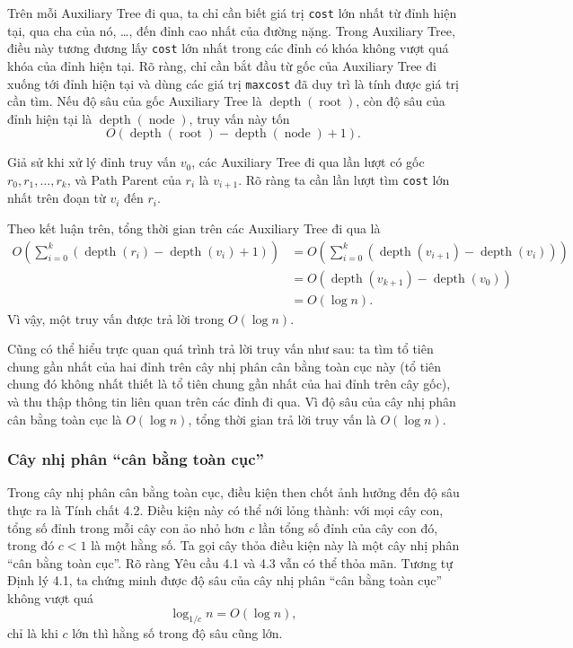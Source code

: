 \documentclass[11pt]{article}
\begin{document}
Trên mỗi Auxiliary Tree đi qua, ta chỉ cần biết giá trị \texttt{cost} lớn nhất
từ đỉnh hiện tại, qua cha của nó, \ldots, đến đỉnh cao nhất của đường nặng.
Trong Auxiliary Tree, điều này tương đương lấy \texttt{cost} lớn nhất trong
các đỉnh có khóa không vượt quá khóa của đỉnh hiện tại. Rõ ràng, chỉ cần bắt
đầu từ gốc của Auxiliary Tree đi xuống tới đỉnh hiện tại và dùng các giá trị
\texttt{maxcost} đã duy trì là tính được giá trị cần tìm. Nếu độ sâu của gốc
Auxiliary Tree là $\operatorname{depth}(\operatorname{root})$, còn độ sâu của
đỉnh hiện tại là $\operatorname{depth}(\operatorname{node})$, truy vấn này tốn
\[
  O(\operatorname{depth}(\operatorname{root})
    -\operatorname{depth}(\operatorname{node})+1).
\]

Giả sử khi xử lý đỉnh truy vấn $v_0$, các Auxiliary Tree đi qua lần lượt có
gốc $r_0,r_1,\ldots,r_k$, và Path Parent của $r_i$ là $v_{i+1}$. Rõ ràng ta
cần lần lượt tìm \texttt{cost} lớn nhất trên đoạn từ $v_i$ đến $r_i$.

Theo kết luận trên, tổng thời gian trên các Auxiliary Tree đi qua là
\[
\begin{aligned}
O\left(\sum_{i=0}^{k}
(\operatorname{depth}(r_i)-\operatorname{depth}(v_i)+1)\right)
&=
O\left(\sum_{i=0}^{k}
(\operatorname{depth}(v_{i+1})-\operatorname{depth}(v_i))\right) \\
&= O(\operatorname{depth}(v_{k+1})-\operatorname{depth}(v_0)) \\
&= O(\log n).
\end{aligned}
\]
Vì vậy, một truy vấn được trả lời trong $O(\log n)$.

Cũng có thể hiểu trực quan quá trình trả lời truy vấn như sau: ta tìm tổ tiên
chung gần nhất của hai đỉnh trên cây nhị phân cân bằng toàn cục này (tổ tiên
chung đó không nhất thiết là tổ tiên chung gần nhất của hai đỉnh trên cây gốc),
và thu thập thông tin liên quan trên các đỉnh đi qua. Vì độ sâu của cây nhị
phân cân bằng toàn cục là $O(\log n)$, tổng thời gian trả lời truy vấn là
$O(\log n)$.

\subsubsection{Cây nhị phân ``cân bằng toàn cục''}

Trong cây nhị phân cân bằng toàn cục, điều kiện then chốt ảnh hưởng đến độ sâu
thực ra là Tính chất 4.2. Điều kiện này có thể nới lỏng thành: với mọi cây con,
tổng số đỉnh trong mỗi cây con ảo nhỏ hơn $c$ lần tổng số đỉnh của cây con đó,
trong đó $c<1$ là một hằng số. Ta gọi cây thỏa điều kiện này là một cây nhị
phân ``cân bằng toàn cục''. Rõ ràng Yêu cầu 4.1 và 4.3 vẫn có thể thỏa mãn.
Tương tự Định lý 4.1, ta chứng minh được độ sâu của cây nhị phân ``cân bằng
toàn cục'' không vượt quá
\[
  \log_{1/c} n = O(\log n),
\]
chỉ là khi $c$ lớn thì hằng số trong độ sâu cũng lớn.
\end{document}

